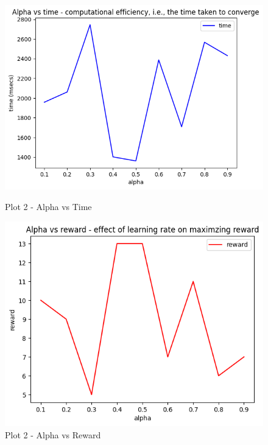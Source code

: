 \documentclass[conference]{IEEEtran}
\begin{document}
\begin{figure}[htbp]
    \vspace{0.5cm}

    \begin{minipage}[b]{0.45\linewidth}
        \centering
        \includegraphics[width=\textwidth]{Plots/alpha vs time 5.png}
        \caption{Plot 2 - Alpha vs Time}
        \label{fig:figure3}
    \end{minipage}
    \hfill
    \begin{minipage}[b]{0.45\linewidth}
        \centering
        \includegraphics[width=\textwidth]{Plots/alpha vs reward 5.png}
        \caption{Plot 2 - Alpha vs Reward}
        \label{fig:figure4}
    \end{minipage}
\end{figure}
\end{document}
